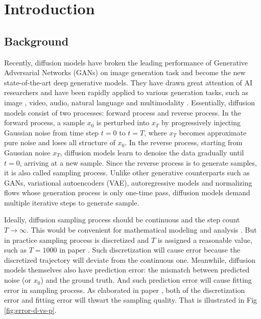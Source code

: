 \chapter{Introduction}
\label{chap:introduction}

\section{Background}
Recently, diffusion models \cite{nips_ddpm} \cite{iclr_ddim} \cite{lu2022dpm} have broken the leading performance of Generative Adversarial Networks (GANs) \cite{NIPS2014_5ca3e9b1} on image generation task and become the new state-of-the-art deep generative models. 
They have drawn great attention of AI researchers and have been rapidly applied to various generation tasks, such as image \cite{highresLDM}\cite{diff_autoencoder}, video\cite{videoDM}, audio\cite{oord2016wavenet}, natural language\cite{brown2020language} and multimodality \cite{url_stable} \cite{url_dalle2} \cite{cvpr_tcig}. 
Essentially, diffusion models consist of two processes: forward process and reverse process. In the forward process, a sample $x_0$ is perturbed into $x_T$ by progressively injecting Gaussian noise from time step $t=0$ to $t=T$, where $x_T$ becomes approximate pure noise and loses all structure of $x_0$. In the reverse process, starting from Gaussian noise $x_T$, diffusion models learn to denoise the data gradually until $t=0$, arriving at a new sample. Since the reverse process is to generate samples, it is also called sampling process. 
Unlike other generative counterparts such as GANs, variational autoencoders (VAE)\cite{kingma2013auto}, autoregressive models\cite{van2016conditional} and normalizing flows \cite{kingma2018glow} \cite{rezende2015variational} whose generation process is only one-time pass, diffusion models demand multiple iterative steps to generate sample.

Ideally, diffusion sampling process should be continuous and the step count $T\rightarrow\infty$. This would be convenient for mathematical modeling and analysis \cite{song2020score}.
But in practice sampling process is discretized and $T$ is assigned a reasonable value, such as $T=1000$ in paper \cite{nips_ddpm}. Such discretization will cause error because the discretized trajectory will deviate from the continuous one. Meanwhile, diffusion models themselves also have prediction error: the mismatch between predicted noise (or $x_0$) and the ground truth. And such prediction error will cause fitting error in sampling process.
As elaborated in paper \cite{zhang2022deis}, both of the discretization error and fitting error will thwart the sampling quality. That is illustrated in Fig \ref{fig:error-d-vs-p}.

